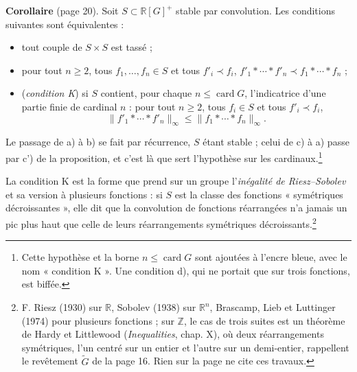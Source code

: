 \documentclass[11pt,a4paper]{article}
\begin{document}
\textbf{Corollaire} (page 20). Soit $S \subset \mathbb{R}[G]^+$ stable par
convolution. Les conditions suivantes sont équivalentes :
\begin{itemize}
  \item[a)] tout couple de $S \times S$ est tassé ;
  \item[b)] pour tout $n \geqslant 2$, tous $f_1, \ldots, f_n \in S$ et tous
  $f'_i \prec f_i$,
  $f'_1 * \cdots * f'_n \prec f_1 * \cdots * f_n$ ;
  \item[c)] (\emph{condition K}) si $S$ contient, pour chaque
  $n \leqslant \operatorname{card} G$, l'indicatrice d'une partie finie de
  cardinal $n$ : pour tout $n \geqslant 2$, tous $f_i \in S$ et tous
  $f'_i \prec f_i$,
  \[
  \|f'_1 * \cdots * f'_n\|_\infty \leqslant \|f_1 * \cdots * f_n\|_\infty .
  \]
\end{itemize}
Le passage de a) à b) se fait par récurrence, $S$ étant stable ; celui de c)
à a) passe par c') de la proposition, et c'est là que sert l'hypothèse sur
les cardinaux.\footnote{Cette hypothèse et la borne
$n \leqslant \operatorname{card} G$ sont ajoutées à l'encre bleue, avec le
nom « condition K ». Une condition d), qui ne portait que sur trois
fonctions, est biffée.}

La condition K est la forme que prend sur un groupe l'\emph{inégalité de
Riesz--Sobolev} et sa version à plusieurs fonctions : si $S$ est la classe
des fonctions « symétriques décroissantes », elle dit que la convolution de
fonctions réarrangées n'a jamais un pic plus haut que celle de leurs
réarrangements symétriques décroissants.\footnote{F. Riesz (1930) sur
$\mathbb{R}$, Sobolev (1938) sur $\mathbb{R}^n$, Brascamp, Lieb et Luttinger
(1974) pour plusieurs fonctions ; sur $\mathbb{Z}$, le cas de trois suites
est un théorème de Hardy et Littlewood (\emph{Inequalities}, chap. X), où
deux réarrangements symétriques, l'un centré sur un entier et l'autre sur un
demi-entier, rappellent le revêtement $\widetilde{G}$ de la page 16. Rien sur la page ne cite ces travaux.}
\end{document}
